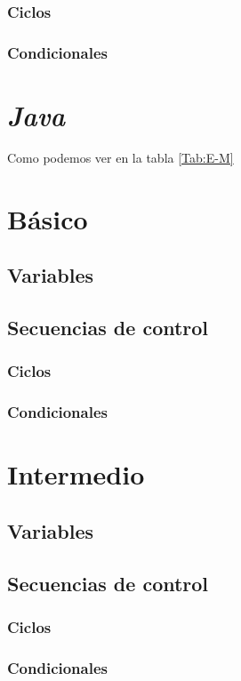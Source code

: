 \documentclass{IEEEtran}
\begin{document}
\subsubsection{Ciclos}	\lipsum[1-10]
\subsubsection{Condicionales}	\lipsum[1-10]

			
				
		\section{\textit{Java}}
		Como podemos ver en la tabla \ref{Tab:E-M}
					\lipsum[1-10]
			\section{Básico}	\lipsum[1-10]
				\subsection{Variables}	\lipsum[1-10]
				\subsection{Secuencias de control}	\lipsum[1-10]
					\subsubsection{Ciclos}	\lipsum[1-10]
					\subsubsection{Condicionales}
				\section{Intermedio}	\lipsum[1-10]
					\subsection{Variables}	\lipsum[1-10]
					\subsection{Secuencias de control}	\lipsum[1-10]
						\subsubsection{Ciclos}	\lipsum[1-10]
						\subsubsection{Condicionales}	\lipsum[1-10]
					
\end{document}
